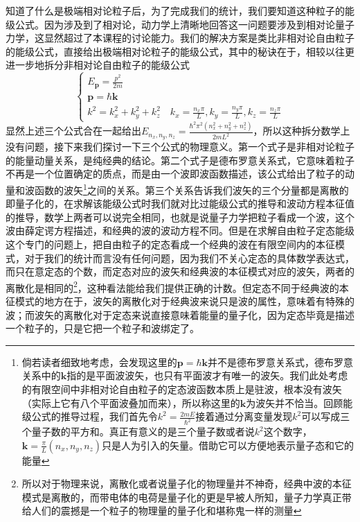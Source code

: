 \documentclass[../../main.tex]{subfiles}
\begin{document}
知道了什么是极端相对论粒子后，为了完成我们的统计，我们要知道这种粒子的能级公式。因为涉及到了相对论，动力学上清晰地回答这一问题要涉及到相对论量子力学，这显然超过了本课程的讨论能力。我们的解决方案是类比非相对论自由粒子的能级公式，直接给出极端相对论粒子的能级公式，其中的秘诀在于，相较以往更进一步地拆分非相对论自由粒子的能级公式
\begin{equation}
    \begin{cases}
        \displaystyle E_{\bm{p}}=\frac{p^2}{2m} \\
        \displaystyle \bm{p}=\hbar\bm{k} \\
        \displaystyle k^2=k_x^2+k_y^2+k_z^2 \quad k_x=\frac{n_x\pi}{L},k_y=\frac{n_y\pi}{L},k_z=\frac{n_z\pi}{L}
    \end{cases}
\end{equation}
显然上述三个公式合在一起给出\(E_{n_x,n_y,n_z}=\frac{\hbar^2\pi^2(n_x^2+n_y^2+n_z^2)}{2mL^2}\)，所以这种拆分数学上没有问题，接下来我们探讨一下三个公式的物理意义。第一个式子是非相对论粒子的能量动量关系，是纯经典的结论。第二个式子是德布罗意关系式，它意味着粒子不再是一个位置确定的质点，而是由一个波即波函数描述，该公式给出了粒子的动量和波函数的波矢\footnote{\label{fn:自由粒子能级公式的波矢评述}倘若读者细致地考虑，会发现这里的\(\bm{p}=\hbar\bm{k}\)并不是德布罗意关系式，德布罗意关系中的\(\bm{k}\)指的是平面波波矢，也只有平面波才有唯一的波矢。我们此处考虑的有限空间中非相对论自由粒子的定态波函数本质上是驻波，根本没有波矢（实际上它有八个平面波叠加而来），所以称这里的\(\bm{k}\)为波矢并不恰当。回顾能级公式的推导过程，我们首先令\(k^2=\frac{2mE}{\hbar^2}\)接着通过分离变量发现\(k^2\)可以写成三个量子数的平方和。真正有意义的是三个量子数或者说\(k^2\)这个数字，\(\bm{k}=\frac{\pi}{L}(n_x,n_y,n_z)\)只是人为引入的矢量。借助它可以方便地表示量子态和它的能量}之间的关系。第三个关系告诉我们波矢的三个分量都是离散的即量子化的，在求解该能级公式时我们就对比过能级公式的推导和波动方程本征值的推导，数学上两者可以说完全相同，也就是说量子力学把粒子看成一个波，这个波由薛定谔方程描述，和经典的波的波动方程不同。但是在求解自由粒子定态能级这个专门的问题上，把自由粒子的定态看成一个经典的波在有限空间内的本征模式，对于我们的统计而言没有任何问题，因为我们不关心定态的具体数学表达式，而只在意定态的个数，而定态对应的波矢和经典波的本征模式对应的波矢，两者的离散化是相同的\footnote{所以对于物理来说，离散化或者说量子化的物理量并不神奇，经典中波的本征模式是离散的，而带电体的电荷是量子化的更是早被人所知，量子力学真正带给人们的震撼是一个粒子的物理量的量子化和堪称鬼一样的测量}，这种看法能给我们提供正确的计数。但定态不同于经典波的本征模式的地方在于，波矢的离散化对于经典波来说只是波的属性，意味着有特殊的波；而波矢的离散化对于定态来说直接意味着能量的量子化，因为定态毕竟是描述一个粒子的，只是它把一个粒子和波绑定了。
\end{document}
